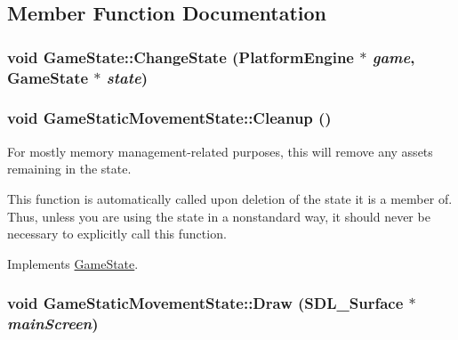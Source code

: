 \subsection{Member Function Documentation}
\hypertarget{class_game_state_f786aeb704a22a135dc289bb89fcc452}{
\subsubsection[{ChangeState}]{\setlength{\rightskip}{0pt plus 5cm}void GameState::ChangeState ({\bf PlatformEngine} $\ast$ {\em game}, \/  {\bf GameState} $\ast$ {\em state})}}
\label{dd/d87/class_game_state_f786aeb704a22a135dc289bb89fcc452}


\hypertarget{class_game_static_movement_state_072662abaf5a872f7919e7fc44200a04}{
\subsubsection[{Cleanup}]{\setlength{\rightskip}{0pt plus 5cm}void GameStaticMovementState::Cleanup ()}}
\label{d7/d3b/class_game_static_movement_state_072662abaf5a872f7919e7fc44200a04}


For mostly memory management-related purposes, this will remove any assets remaining in the state.

This function is automatically called upon deletion of the state it is a member of. Thus, unless you are using the state in a nonstandard way, it should never be necessary to explicitly call this function. 

Implements \hyperlink{class_game_state_041e7a5430d71da84745af11abdacd93}{GameState}.\hypertarget{class_game_static_movement_state_2c2d82b3dbc8e431682b53ce05294f27}{
\subsubsection[{Draw}]{\setlength{\rightskip}{0pt plus 5cm}void GameStaticMovementState::Draw (SDL\_\-Surface $\ast$ {\em mainScreen})}}
\label{d7/d3b/class_game_static_movement_state_2c2d82b3dbc8e431682b53ce05294f27}


